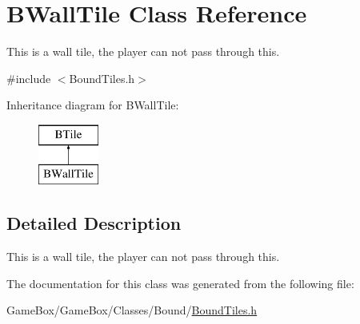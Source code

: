 \hypertarget{class_b_wall_tile}{\section{\-B\-Wall\-Tile \-Class \-Reference}
\label{class_b_wall_tile}
}


\-This is a wall tile, the player can not pass through this.  




{\ttfamily \#include $<$\-Bound\-Tiles.\-h$>$}

\-Inheritance diagram for \-B\-Wall\-Tile\-:\begin{figure}[H]
\begin{center}
\leavevmode
\includegraphics[height=2.000000cm]{class_b_wall_tile}
\end{center}
\end{figure}


\subsection{\-Detailed \-Description}
\-This is a wall tile, the player can not pass through this. 

\-The documentation for this class was generated from the following file\-:\begin{DoxyCompactItemize}
\item 
\-Game\-Box/\-Game\-Box/\-Classes/\-Bound/\hyperlink{_bound_tiles_8h}{\-Bound\-Tiles.\-h}\end{DoxyCompactItemize}
